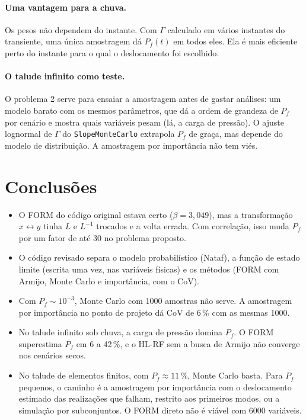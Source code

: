 \documentclass[11pt,a4paper]{article}
\begin{document}
\paragraph{Uma vantagem para a chuva.} Os pesos não dependem do instante. Com $\Gamma$ calculado em vários instantes do
transiente, uma única amostragem dá $P_f(t)$ em todos eles. Ela é mais eficiente perto do instante para o qual o
deslocamento foi escolhido.

\paragraph{O talude infinito como teste.} O problema 2 serve para ensaiar a amostragem antes de gastar análises: um
modelo barato com os mesmos parâmetros, que dá a ordem de grandeza de $P_f$ por cenário e mostra quais variáveis pesam
(lá, a carga de pressão). O ajuste lognormal de $\Gamma$ do \texttt{SlopeMonteCarlo} extrapola $P_f$ de graça, mas
depende do modelo de distribuição. A amostragem por importância não tem viés.

\section{Conclusões}
\begin{itemize}
  \item O FORM do código original estava certo ($\beta = 3{,}049$), mas a transformação $x \leftrightarrow y$ tinha
    $L$ e $L^{-1}$ trocados e a volta errada. Com correlação, isso muda $P_f$ por um fator de até 30 no problema
    proposto.
  \item O código revisado separa o modelo probabilístico (Nataf), a função de estado limite (escrita uma vez, nas
    variáveis físicas) e os métodos (FORM com Armijo, Monte Carlo e importância, com o CoV).
  \item Com $P_f \sim 10^{-3}$, Monte Carlo com 1000 amostras não serve. A amostragem por importância no ponto de
    projeto dá CoV de 6\,\% com as mesmas 1000.
  \item No talude infinito sob chuva, a carga de pressão domina $P_f$. O FORM superestima $P_f$ em 6 a 42\,\%, e o HL-RF
    sem a busca de Armijo não converge nos cenários secos.
  \item No talude de elementos finitos, com $P_f \approx 11\,\%$, Monte Carlo basta. Para $P_f$ pequenos, o caminho é
    a amostragem por importância com o deslocamento estimado das realizações que falham, restrito aos primeiros modos,
    ou a simulação por subconjuntos. O FORM direto não é viável com 6000 variáveis.
\end{itemize}
\end{document}

